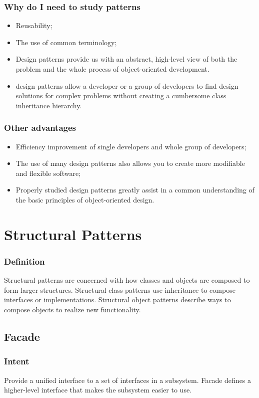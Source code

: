 \documentclass[10pt,xcolor={usenames,dvipsnames}]{beamer}
\begin{document}
\begin{frame}[fragile]
	\frametitle{Why do I need to study patterns}
	\begin{itemize}
		\item Reusability;
		\item The use of common terminology;
		\item Design patterns provide us with an abstract, high-level view of
		both the problem and the whole process of object-oriented development.
	\item design patterns allow a developer or a group of developers to find design solutions for complex problems without creating a cumbersome class inheritance hierarchy.
	\end{itemize}
\end{frame}

\begin{frame}[fragile]
	\frametitle{Other advantages}
	\begin{itemize}
		\item Efficiency improvement of single developers and whole group of developers;
		\item The use of many design patterns also allows you to create more modifiable and flexible software;
		\item Properly studied design patterns greatly assist in a common understanding of the basic principles of object-oriented design. 
	\end{itemize}
\end{frame}

\section{Structural Patterns}
\begin{frame}[fragile]
	\frametitle{Definition}
	\begin{exampleblock}{}
	Structural patterns are concerned with how classes and objects are composed to form
	larger structures. Structural class patterns use inheritance to compose interfaces or
	implementations. Structural object patterns describe ways to compose objects to
	realize new functionality.
	\end{exampleblock}
\end{frame}

\subsection{Facade}
\begin{frame}[fragile]
	\frametitle{Intent}
	\begin{exampleblock}{}
	Provide a unified interface to a set of interfaces in a subsystem. Facade defines a
	higher-level interface that makes the subsystem easier to use.
	\end{exampleblock}
\end{frame}
\end{document}
